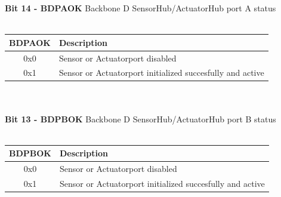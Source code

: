 \documentclass{article}
\begin{document}
\textbf{Bit 14 - BDPAOK} Backbone D SensorHub/ActuatorHub port A status\\\\
\begin{tabular}{|c|l|}
    \hline
   BDPAOK & Description\\ \hline
   0x0 & Sensor or Actuatorport disabled\\ \hline
   0x1 & Sensor or Actuatorport initialized succesfully and active\\ \hline
\end{tabular}\\\\
\textbf{Bit 13 - BDPBOK} Backbone D SensorHub/ActuatorHub port B status\\\\
\begin{tabular}{|c|l|}
    \hline
   BDPBOK & Description\\ \hline
   0x0 & Sensor or Actuatorport disabled\\ \hline
   0x1 & Sensor or Actuatorport initialized succesfully and active\\ \hline
\end{tabular}\\\\
\end{document}
